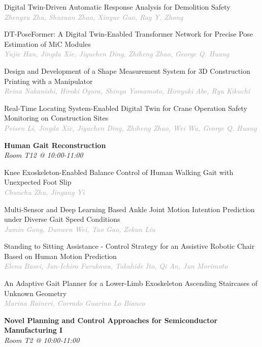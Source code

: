 \begin{multicols*}{2}
\small Digital Twin-Driven Automatic Response Analysis for Demolition Safety\\ 
\footnotesize \textcolor{darkgray}{\textit{Zhengxu Zhu, Shuxuan  Zhao, Xinyue  Guo, Ray Y.  Zhong}}

\small DT-PoseFormer: A Digital Twin-Enabled Transformer Network for Precise Pose Estimation of MiC Modules\\ 
\footnotesize \textcolor{darkgray}{\textit{Yujie Han, Jingda  Xie, Jiyuchen  Ding, Zhiheng  Zhao, George Q.  Huang}}

\small Design and Development of a Shape Measurement System for 3D Construction Printing with a Manipulator\\ 
\footnotesize \textcolor{darkgray}{\textit{Reina Nakanishi, Hiroki  Ogura, Shinya  Yamamoto, Hiroyuki  Abe, Ryu  Kikuchi}}

\small Real-Time Locating System-Enabled Digital Twin for Crane Operation Safety Monitoring on Construction Sites\\ 
\footnotesize \textcolor{darkgray}{\textit{Peisen Li, Jingda  Xie, Jiyuchen  Ding, Zhiheng  Zhao, Wei  Wu, George Q.  Huang}}

\normalsize \textbf{Human Gait Reconstruction}\\
\small \textit{Room T12 @ 10:00-11:00}

\small Knee Exoskeleton-Enabled Balance Control of Human Walking Gait with Unexpected Foot Slip\\ 
\footnotesize \textcolor{darkgray}{\textit{Chunchu Zhu, Jingang  Yi}}

\small Multi-Sensor and Deep Learning Based Ankle Joint Motion Intention Prediction under Diverse Gait Speed Conditions\\ 
\footnotesize \textcolor{darkgray}{\textit{Jumin Gong, Dunwen  Wei, Tao  Gao, Zekun  Liu}}

\small Standing to Sitting Assistance - Control Strategy for an Assistive Robotic Chair Based on Human Motion Prediction\\ 
\footnotesize \textcolor{darkgray}{\textit{Elena Basei, Jun-Ichiro  Furukawa, Takahide  Ito, Qi  An, Jun  Morimoto}}

\small An Adaptive Gait Planner for a Lower-Limb Exoskeleton Ascending Staircases of Unknown Geometry\\ 
\footnotesize \textcolor{darkgray}{\textit{Marina Raineri, Corrado  Guarino Lo Bianco}}

\normalsize \textbf{Novel Planning and Control Approaches for Semiconductor Manufacturing I}\\
\small \textit{Room T2 @ 10:00-11:00}


\end{multicols*}
